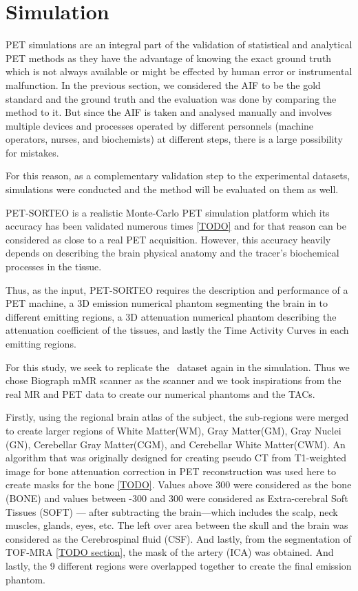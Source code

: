 \section{Simulation}
PET simulations are an integral part of the validation of statistical and analytical PET methods as they have the advantage of knowing the exact ground truth which is not always available or might be effected by human error or instrumental malfunction.
In the previous section, we considered the AIF to be the gold standard and the ground truth and the evaluation was done by comparing the method to it.
But since the AIF is taken and analysed manually and involves multiple devices and processes operated by different personnels (machine operators, nurses, and biochemists) at different steps, there is a large possibility for mistakes.

For this reason, as a complementary validation step to the experimental datasets, simulations were conducted and the method will be evaluated on them as well.

PET-SORTEO is a realistic Monte-Carlo PET simulation platform which its accuracy has been validated numerous times \ref{TODO} and for that reason can be considered as close to a real PET acquisition.
However, this accuracy heavily depends on describing the brain physical anatomy and the tracer's biochemical processes in the tissue.

Thus, as the input, PET-SORTEO requires the description and performance of a PET machine, a 3D emission numerical phantom segmenting the brain in to different emitting regions, a 3D attenuation numerical phantom describing the attenuation coefficient of the tissues, and lastly the Time Activity Curves in each emitting regions.

For this study, we seek to replicate the \fdg$\,$ dataset again in the simulation.
Thus we chose Biograph mMR scanner as the scanner and we took inspirations from the real MR and PET data to create our numerical phantoms and the TACs.

Firstly, using the regional brain atlas of the subject, the sub-regions were merged to create larger regions of White Matter(WM), Gray Matter(GM), Gray Nuclei (GN), Cerebellar Gray Matter(CGM), and Cerebellar White Matter(CWM).
An algorithm that was originally designed for creating pseudo CT from T1-weighted image for bone attenuation correction in PET reconstruction was used here to create masks for the bone \ref{TODO}.
Values above 300 were considered as the bone (BONE) and values between -300 and 300 were considered as Extra-cerebral Soft Tissues (SOFT) --- after subtracting the brain---which includes the scalp, neck muscles, glands, eyes, etc.
The left over area between the skull and the brain was considered as the Cerebrospinal fluid (CSF).
And lastly, from the segmentation of TOF-MRA \ref{TODO section}, the mask of the artery (ICA) was obtained.
And lastly, the 9 different regions were overlapped together to create the final emission phantom.

